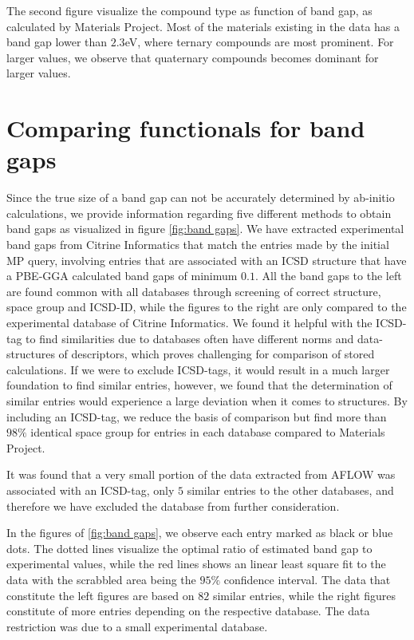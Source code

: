 \clearpage

\noindent The second figure visualize the compound type as function of band gap, as calculated by Materials Project. Most of the materials existing in the data has a band gap lower than $2.3$eV, where ternary compounds are most prominent. For larger values, we observe that quaternary compounds becomes dominant for larger values.

\section{Comparing functionals for band gaps}

Since the true size of a band gap can not be accurately determined by ab-initio calculations, we provide information regarding five different methods to obtain band gaps as visualized in figure \ref{fig:band gaps}. We have extracted experimental band gaps from Citrine Informatics that match the entries made by the initial MP query, involving entries that are associated with an ICSD structure that have a PBE-GGA calculated band gaps of minimum $0.1$. All the band gaps to the left are found common with all databases through screening of correct structure, space group and ICSD-ID, while the figures to the right are only compared to the experimental database of Citrine Informatics. We found it helpful with the ICSD-tag to find similarities due to databases often have different norms and data-structures of descriptors, which proves challenging for comparison of stored calculations. If we were to exclude ICSD-tags, it would result in a much larger foundation to find similar entries, however, we found that the determination of similar entries would experience a large deviation when it comes to structures. By including an ICSD-tag, we reduce the basis of comparison but find more than $98\%$ identical space group for entries in each database compared to Materials Project.

It was found that a very small portion of the data extracted from AFLOW was associated with an ICSD-tag, only $5$ similar entries to the other databases, and therefore we have excluded the database from further consideration.

In the figures of \ref{fig:band gaps}, we observe each entry marked as black or blue dots. The dotted lines visualize the optimal ratio of estimated band gap to experimental values, while the red lines shows an linear least square fit to the data with the scrabbled area being the $95\%$ confidence interval. The data that constitute the left figures are based on $82$ similar entries, while the right figures constitute of more entries depending on the respective database. The data restriction was due to a small experimental database.

